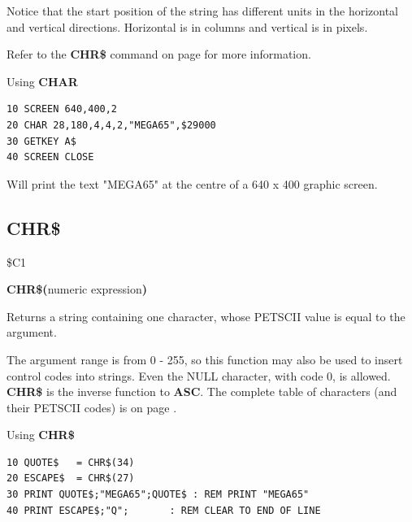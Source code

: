 \begin{description}[leftmargin=2cm,style=nextline]
                Notice that the start position of the string has
                different units in the horizontal and vertical directions.
                Horizontal is in columns and vertical is in pixels.

                Refer to the {\bf CHR\$} command on page \pageref{chrcommand}
                for more information.

\item [Example:] Using {\bf CHAR}
\begin{tcolorbox}[colback=black,coltext=white]
\verbatimfont{\codefont}
\begin{verbatim}
10 SCREEN 640,400,2
20 CHAR 28,180,4,4,2,"MEGA65",$29000
30 GETKEY A$
40 SCREEN CLOSE
\end{verbatim}
\end{tcolorbox}
Will print the text "MEGA65" at the centre of a 640 x 400 graphic screen.
\end{description}


\newpage
{}
\subsection{CHR\$}
\label{chrcommand}
\begin{description}[leftmargin=2cm,style=nextline]
\item [Token:] \$C1
\item [Format:] {\bf CHR\$(}numeric expression{\bf)}
\item [Usage:] Returns a string containing one character, whose PETSCII
               value is equal to the argument.

\item [Remarks:] The argument range is from 0 - 255, so this function may
                 also be used to insert control codes into strings.
                 Even the NULL character, with code 0, is allowed. \\
                 {\bf CHR\$} is the inverse function to {\bf ASC}.
                 The complete table of characters (and their PETSCII codes) is
                 on page \pageref{appendix:asciicodes}.
\item [Example:] Using {\bf CHR\$}
\begin{tcolorbox}[colback=black,coltext=white]
\verbatimfont{\codefont}
\begin{verbatim}
10 QUOTE$   = CHR$(34)
20 ESCAPE$  = CHR$(27)
30 PRINT QUOTE$;"MEGA65";QUOTE$ : REM PRINT "MEGA65"
40 PRINT ESCAPE$;"Q";       : REM CLEAR TO END OF LINE
\end{verbatim}
\end{tcolorbox}
\end{description}

